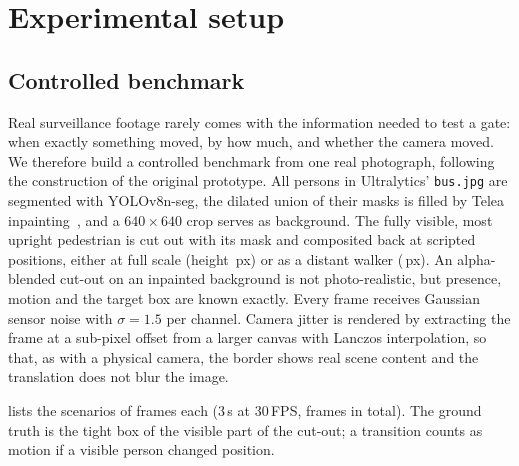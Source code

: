 \documentclass[12pt,a4paper]{article}
\theoremstyle{plain}
\theoremstyle{definition}
\newcommand{\code}[1]{\texttt{#1}}
\begin{document}
\newpage

\section{Experimental setup}\label{sec:experiments}

\subsection{Controlled benchmark}\label{sec:benchmark}
Real surveillance footage rarely comes with the information needed to test a gate: when exactly something moved, by how much, and whether the camera moved. We therefore build a controlled benchmark from one real photograph, following the construction of the original prototype. All persons in Ultralytics' \code{bus.jpg} are segmented with YOLOv8n-seg, the dilated union of their masks is filled by Telea inpainting~\cite{telea2004inpainting}, and a $640\times640$ crop serves as background. The fully visible, most upright pedestrian is cut out with its mask and composited back at scripted positions, either at full scale (height \HeightC\,px) or as a distant walker (\HeightB\,px). An alpha-blended cut-out on an inpainted background is not photo-realistic, but presence, motion and the target box are known exactly. Every frame receives Gaussian sensor noise with $\sigma=1.5$ per channel. Camera jitter is rendered by extracting the frame at a sub-pixel offset from a larger canvas with Lanczos interpolation, so that, as with a physical camera, the border shows real scene content and the translation does not blur the image.

 lists the \NScen{} scenarios of \NFramesScen{} frames each (3\,s at 30\,FPS, \NFramesCtrl{} frames in total). The ground truth is the tight box of the visible part of the cut-out; a transition counts as motion if a visible person changed position.
\end{document}
